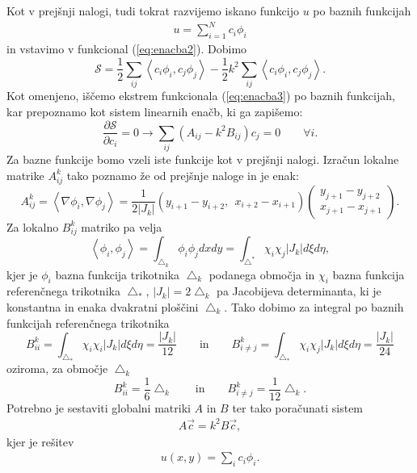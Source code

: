 \documentclass[12pt,a4paper]{article}
\begin{document}
Kot v prejšnji nalogi, tudi tokrat razvijemo iskano funkcijo $u$ po baznih funkcijah
\begin{align*}
u=\sum_{i=1} ^{N} c_i \phi _i 
\end{align*}
in vstavimo v funkcional (\ref{eq:enacba2}). Dobimo
\begin{equation} \label{eq:enacba3}
\mathcal{S}=\frac{1}{2} \sum _{ij} \left\langle  c_i \phi _i , c_j \phi_j   \right\rangle - \frac{1}{2} k^{2} \sum _{ij} \left\langle  c_i \phi _i , c_j \phi_j   \right\rangle.
\end{equation}
Kot omenjeno, iščemo ekstrem funkcionala (\ref{eq:enacba3}) po baznih funkcijah, kar prepoznamo kot sistem linearnih enačb, ki ga zapišemo:
\begin{equation}
\frac{ \partial \mathcal{S}}{\partial c_i}= 0 \rightarrow \sum _{ij} (A_{ij} - k^{2} B_{ij})c_j = 0  \qquad  \forall i.
\end{equation}
Za bazne funkcije bomo vzeli iste funkcije kot v prejšnji nalogi.
Izračun lokalne matrike $A^{k}_{ij}$ tako poznamo že od prejšnje naloge in je enak:
\begin{equation*}
A^{k}_{ij}=\left\langle   \nabla \phi _i , \nabla \phi_j   \right\rangle =\frac{1}{2|J_k|} (y_{i+1} - y_{i+2} , \ \ x_{i+2} - x_{i+1})
\begin{pmatrix}
 y_{j+1} - y_{j+2} \\ x_{j+1} - x_{j+1}
\end{pmatrix}.
\end{equation*}
Za lokalno $B^{k}_{ij}$ matriko pa velja
\begin{equation*}
\left\langle  \phi _i , \phi_j   \right\rangle = \int _{\bigtriangleup_{k}} \phi _i \phi _j dx dy =\int _{\bigtriangleup ^{*}} \chi _i \chi _j |J_k| d\xi d\eta,
\end{equation*}
kjer je $\phi_i$ bazna funkcija trikotnika $\bigtriangleup _{k}$ podanega območja in $\chi_i$ bazna funkcija referenčnega trikotnika $\bigtriangleup_{*}$, $|J_k|=2\bigtriangleup_{k}$ pa Jacobijeva determinanta, ki je konstantna in enaka dvakratni ploščini $\bigtriangleup_{k}$. Tako dobimo za integral po baznih funkcijah referenčnega trikotnika
\begin{equation*}
B_{ii} ^{k}= \int _{\bigtriangleup _{*}} \chi _i \chi _i |J_k|d\xi d\eta = \frac{|J_k|}{12} \qquad \textrm{in} \qquad B_{i\neq j}^{k} =  \int _{\bigtriangleup _{*}} \chi _i \chi _j |J_k|d\xi d\eta = \frac{|J_k|}{24}
\end{equation*}
oziroma, za območje $\bigtriangleup_{k}$
\begin{equation}
B_{ii}^{k} = \frac{1}{6} \bigtriangleup_{k} \qquad \textrm{in} \qquad B_{i\neq j}^{k}=\frac{1}{12} \bigtriangleup_{k}.
\end{equation}
Potrebno je sestaviti globalni matriki $A$ in $B$ ter tako poračunati sistem 
\begin{align*}
A \vec{c}= k^{2} B \vec{c},
\end{align*}
kjer je rešitev
\begin{align*}
u(x,y)=\sum_i c_i \phi_i.
\end{align*}
\end{document}
